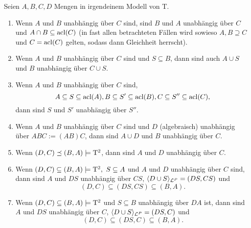 \begin{lemma}\label{Unabhängigkeitsregeln}
	Seien $A,B,C,D$ Mengen in irgendeinem Modell von T.
	\begin{enumerate}
		\item Wenn $A$ und $B$ unabhängig über $C$ sind, sind $B$ und $A$ unabhängig über $C$ und $A\cap B\subseteq\operatorname{acl}(C)$ (in fast allen betrachteten Fällen wird sowieso $A,B\supseteq C$ und $C=\operatorname{acl}(C)$ gelten, sodass dann Gleichheit herrscht).
		\item Wenn $A$ und $B$ unabhängig über $C$ sind und $S\subseteq B$, dann sind auch $A\cup S$ und $B$ unabhängig über $C\cup S$.
		\item Wenn $A$ und $B$ unabhängig über $C$ sind, $$A\subseteq S\subseteq\operatorname{acl}(A),B\subseteq S'\subseteq\operatorname{acl}(B),C\subseteq S''\subseteq\operatorname{acl}(C),$$ dann sind $S$ und $S'$ unabhängig über $S''$.
		\item Wenn $A$ und $B$ unabhängig über $C$ sind und $D$ (algebraisch) unabhängig über $ABC:=(AB)C$, dann sind $A\cup D$ und $B$ unabhängig über $C$.
		\item Wenn $(D,C)\preceq(B,A)\models\operatorname{T^2}$, dann sind $A$ und $D$ unabhängig über $C$.
		\item Wenn $(D,C)\subseteq(B,A)\models\tq,\ S\subseteq A$ und $A$ und $D$ unabhängig über $C$ sind, dann sind $A$ und $DS$ unabhängig über $CS$, $\langle D\cup S\rangle_{\mathcal{L}^P}=(DS,CS)$ und $$(D,C)\subseteq(DS,CS)\subseteq(B,A).$$
		\item Wenn $(D,C)\subseteq(B,A)\models\operatorname{T^2}$ und $S\subseteq B$ unabhängig über $DA$ ist, dann sind $A$ und $DS$ unabhängig über $C$, $\langle D\cup S\rangle_{\mathcal{L}^P}=(DS,C)$ und $$(D,C)\subseteq(DS,C)\subseteq(B,A).$$
	\end{enumerate}
\end{lemma}
\newpage
